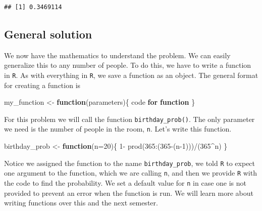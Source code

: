 \documentclass[
]{book}
\newenvironment{Shaded}{\begin{snugshade}}{\end{snugshade}}
\newcommand{\AttributeTok}[1]{\textcolor[rgb]{0.77,0.63,0.00}{#1}}
\newcommand{\ControlFlowTok}[1]{\textcolor[rgb]{0.13,0.29,0.53}{\textbf{#1}}}
\newcommand{\DecValTok}[1]{\textcolor[rgb]{0.00,0.00,0.81}{#1}}
\newcommand{\FunctionTok}[1]{\textcolor[rgb]{0.00,0.00,0.00}{#1}}
\newcommand{\NormalTok}[1]{#1}
\newcommand{\OtherTok}[1]{\textcolor[rgb]{0.56,0.35,0.01}{#1}}
\newcommand{\SpecialCharTok}[1]{\textcolor[rgb]{0.00,0.00,0.00}{#1}}
\begin{document}
\begin{verbatim}
## [1] 0.3469114
\end{verbatim}

\hypertarget{general-solution}{%
\subsection{General solution}\label{general-solution}}

We now have the mathematics to understand the problem. We can easily generalize this to any number of people. To do this, we have to write a function in \texttt{R}. As with everything in \texttt{R}, we save a function as an object. The general format for creating a function is

\begin{Shaded}
\begin{Highlighting}[]
\NormalTok{my\_function }\OtherTok{\textless{}{-}} \ControlFlowTok{function}\NormalTok{(parameters)\{}
\NormalTok{  code }\ControlFlowTok{for} \ControlFlowTok{function}
\NormalTok{\}}
\end{Highlighting}
\end{Shaded}

For this problem we will call the function \texttt{birthday\_prob()}. The only parameter we need is the number of people in the room, \texttt{n}. Let's write this function.

\begin{Shaded}
\begin{Highlighting}[]
\NormalTok{birthday\_prob }\OtherTok{\textless{}{-}} \ControlFlowTok{function}\NormalTok{(}\AttributeTok{n=}\DecValTok{20}\NormalTok{)\{}
  \DecValTok{1}\SpecialCharTok{{-}} \FunctionTok{prod}\NormalTok{(}\DecValTok{365}\SpecialCharTok{:}\NormalTok{(}\DecValTok{365}\SpecialCharTok{{-}}\NormalTok{(n}\DecValTok{{-}1}\NormalTok{)))}\SpecialCharTok{/}\NormalTok{(}\DecValTok{365}\SpecialCharTok{\^{}}\NormalTok{n)}
\NormalTok{\}}
\end{Highlighting}
\end{Shaded}

Notice we assigned the function to the name \texttt{birthday\_prob}, we told \texttt{R} to expect one argument to the function, which we are calling \texttt{n}, and then we provide \texttt{R} with the code to find the probability. We set a default value for \texttt{n} in case one is not provided to prevent an error when the function is run. We will learn more about writing functions over this and the next semester.
\end{document}

